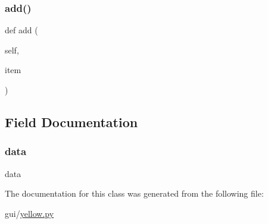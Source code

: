 \subsubsection{\texorpdfstring{add()}{add()}}
{\footnotesize\ttfamily def add (\begin{DoxyParamCaption}\item[{}]{self,  }\item[{}]{item }\end{DoxyParamCaption})}



\subsection{Field Documentation}
\mbox{\label{classyellow_1_1stick_list_a511ae0b1c13f95e5f08f1a0dd3da3d93}} 
\subsubsection{\texorpdfstring{data}{data}}
{\footnotesize\ttfamily data}



The documentation for this class was generated from the following file\+:\begin{DoxyCompactItemize}
\item 
gui/\hyperlink{yellow_8py}{yellow.\+py}\end{DoxyCompactItemize}
